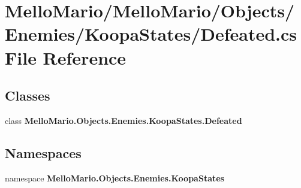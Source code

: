 \section{Mello\+Mario/\+Mello\+Mario/\+Objects/\+Enemies/\+Koopa\+States/\+Defeated.cs File Reference}
\label{KoopaStates_2Defeated_8cs}
\subsection*{Classes}
\begin{DoxyCompactItemize}
\item 
class \textbf{ Mello\+Mario.\+Objects.\+Enemies.\+Koopa\+States.\+Defeated}
\end{DoxyCompactItemize}
\subsection*{Namespaces}
\begin{DoxyCompactItemize}
\item 
namespace \textbf{ Mello\+Mario.\+Objects.\+Enemies.\+Koopa\+States}
\end{DoxyCompactItemize}
